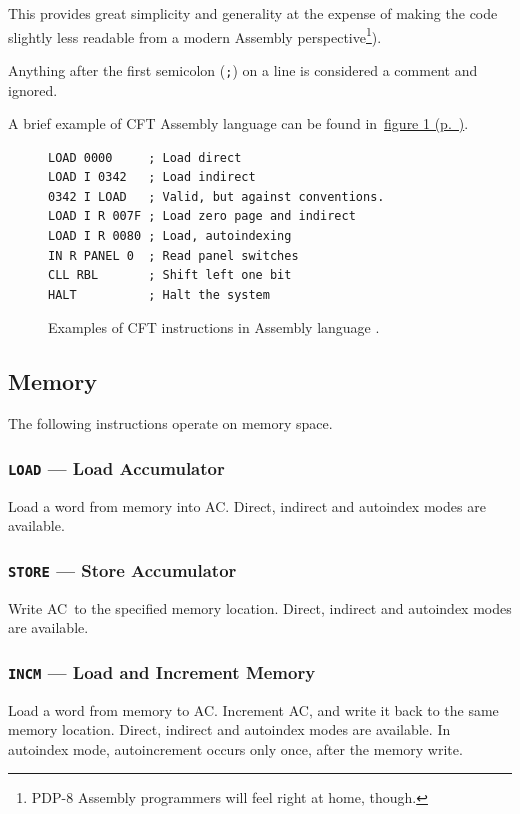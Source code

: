 \documentclass[11pt,a4paper,twocolumns]{article}
\newcommand{\cf}[2][section]{\hyperref[#2]{#1 \ref*{#2} (p.~\pageref*{#2})}}
\newcommand{\fcf}[1]{\cf[figure]{#1}}
\newcommand\register[1]{\textsf{#1}}
\newcommand\A{\register{AC}}
\begin{document}
This provides great simplicity and generality at the expense of making
the code slightly less readable from a modern Assembly
perspective\footnote{PDP-8 Assembly programmers will feel right at
  home, though.}).

Anything after the first semicolon ({\tt ;}) on a line is considered a
comment and ignored.

A brief example of CFT Assembly language can be found in~\fcf{fig-asm}.

\begin{figure}
\small
\begin{verbatim}
LOAD 0000     ; Load direct
LOAD I 0342   ; Load indirect
0342 I LOAD   ; Valid, but against conventions.
LOAD I R 007F ; Load zero page and indirect
LOAD I R 0080 ; Load, autoindexing
IN R PANEL 0  ; Read panel switches
CLL RBL       ; Shift left one bit
HALT          ; Halt the system
\end{verbatim}
\caption{\label{fig-asm}Examples of CFT instructions in Assembly language .}
\end{figure}

\subsection{Memory}

The following instructions operate on memory space.

\subsubsection{{\tt LOAD} — Load Accumulator}
\label{sec-load}

Load a word from memory into \A. Direct, indirect and autoindex modes are available.

\subsubsection{{\tt STORE} — Store Accumulator}
\label{sec-store}

Write \A\ to the specified memory location. Direct, indirect and autoindex modes are available.

\subsubsection{{\tt INCM} — Load and Increment Memory}
\label{sec-incm}

Load a word from memory to \A. Increment \A{}, and write it back to
the same memory location. Direct, indirect and autoindex modes are
available. In autoindex mode, autoincrement occurs only once, after
the memory write.
\end{document}
